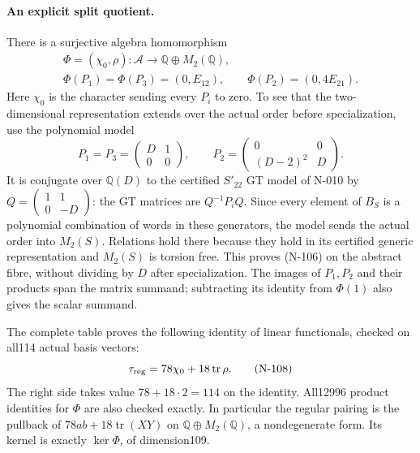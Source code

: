 \paragraph{An explicit split quotient.}
There is a surjective algebra homomorphism
\[
 \begin{gathered}
 \Phi=(\chi_0,\rho):\mathcal A\longrightarrow
                \mathbb Q\oplus M_2(\mathbb Q),\\
 \Phi(P_1)=\Phi(P_3)=(0,E_{12}),\qquad
 \Phi(P_2)=(0,4E_{21}).
 \end{gathered}
 \tag{N-106}
\]
Here $\chi_0$ is the character sending every $P_i$ to zero.
To see that the two-dimensional representation extends over the
actual order before specialization, use the polynomial model
\[
 P_1=P_3=\begin{pmatrix}D&1\\0&0\end{pmatrix},
 \qquad
 P_2=\begin{pmatrix}0&0\\(D-2)^2&D\end{pmatrix}.
 \tag{N-107}
\]
It is conjugate over $\mathbb Q(D)$ to the certified $S'_{22}$
GT model of N-010 by $Q=\left(\begin{smallmatrix}1&1\\0&-D\end{smallmatrix}\right)$:
the GT matrices are $Q^{-1}P_iQ$.  Since every element of $B_S$
is a polynomial combination of words in these generators, the
model sends the actual order into $M_2(S)$.  Relations hold there
because they hold in its certified generic representation and $M_2(S)$ is
torsion free.  This proves (N-106) on the abstract fibre, without
dividing by $D$ after specialization.  The images of $P_1,P_2$
and their products span the matrix summand; subtracting its
identity from $\Phi(1)$ also gives the scalar summand.

The complete table proves the following identity of linear
functionals, checked on all114 actual basis vectors:
\[
       \tau_{\rm reg}=78\chi_0+18\operatorname{tr}\rho.
 \tag{N-108}
\]
The right side takes value $78+18\cdot2=114$ on the identity.
All12996 product identities for $\Phi$ are also checked exactly.
In particular the regular pairing is the pullback of
$78ab+18\operatorname{tr}(XY)$ on
$\mathbb Q\oplus M_2(\mathbb Q)$, a nondegenerate form.
Its kernel is exactly $\ker\Phi$, of dimension109.

